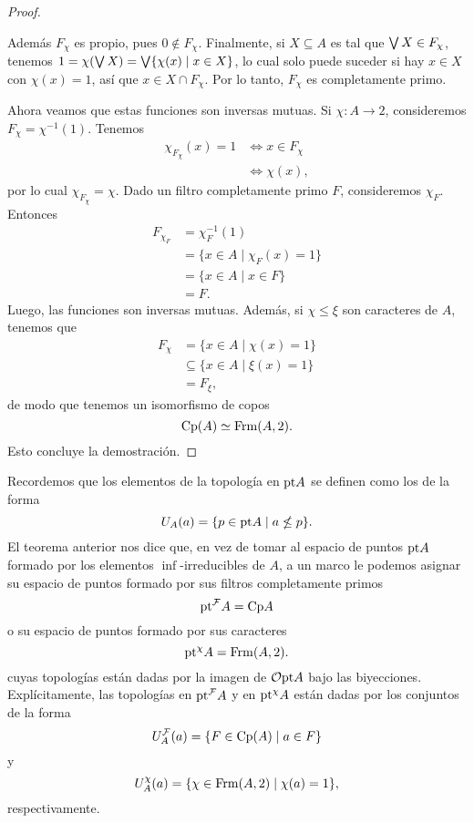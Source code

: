 \begin{proof}
\begin{itemize}
        Además $F_\chi$ es propio, pues $0\nin F_\chi$.
        Finalmente, si $X\subseteq A$ es tal que
        $\bigvee X\in F_\chi$,
        tenemos $1=\chi(\bigvee X)=\bigvee\{\chi(x)\mid x\in X\}$,
        lo cual solo puede suceder si hay $x\in X$ con $\chi(x)=1$,
        así que $x\in X\cap F_\chi$.
        Por lo tanto, $F_\chi$ es completamente primo.
    \end{itemize}
    Ahora veamos que estas funciones son inversas mutuas.
    Si $\chi:A\to 2$, consideremos $F_\chi=\chi^{-1}(1)$.
    Tenemos
    \begin{align*}
        \chi_{F_\chi}(x) = 1
        &\iff x\in F_\chi \\
        &\iff \chi(x),
    \end{align*}
    por lo cual $\chi_{F_\chi}=\chi$.
    Dado un filtro completamente primo $F$, consideremos
    $\chi_F$.
    Entonces
    \begin{align*}
        F_{\chi_F}
        &= \chi_F^{-1}(1) \\
        &= \{x\in A\mid \chi_F(x)=1 \} \\
        &= \{x\in A\mid x\in F\} \\
        &= F.
    \end{align*}
    Luego, las funciones son inversas mutuas.
    Además, si $\chi\leq\xi$ son caracteres de $A$,
    tenemos que
    \begin{align*}
        F_\chi
        &= \{x\in A\mid \chi(x)=1\} \\
        &\subseteq \{x\in A\mid \xi(x)=1\} \\
        &= F_\xi,
    \end{align*}
    de modo que tenemos un isomorfismo de copos
    \[
        \mathrm{Cp}(A) \simeq \mathrm{Frm}(A,2).
    \]
    Esto concluye la demostración.
\end{proof}

Recordemos que los elementos de la topología en $\mathrm{pt} A$
se definen como los de la forma
\[
    U_A(a) = \{p\in\mathrm{pt} A\mid a\nleq p\}.
\]
El teorema anterior nos dice que, en vez de tomar
al espacio de puntos $\mathrm{pt} A$ formado por los elementos
$\inf$-irreducibles de $A$, a un marco le podemos asignar
su espacio de puntos formado por sus filtros completamente primos
\[
    \mathrm{pt}^{\mathcal{F}} A = \mathrm{Cp} A
\]
o su espacio de puntos formado por sus caracteres
\[
    \mathrm{pt}^\chi A = \mathrm{Frm}(A,2).
\]
cuyas topologías están dadas por la imagen de $\mathcal{O}\mathrm{pt} A$
bajo las biyecciones.\\
Explícitamente, las topologías en $\mathrm{pt}^{\mathcal{F}}A$
y en $\mathrm{pt}^\chi A$ están dadas por los conjuntos de la forma
\[
    U^{\mathcal{F}}_A(a) = \{F\in\mathrm{Cp}(A) \mid a\in F\}
\]
y
\[
    U^\chi_A(a) = \{\chi\in\mathrm{Frm}(A,2)\mid\chi(a)=1\},
\]
respectivamente.

